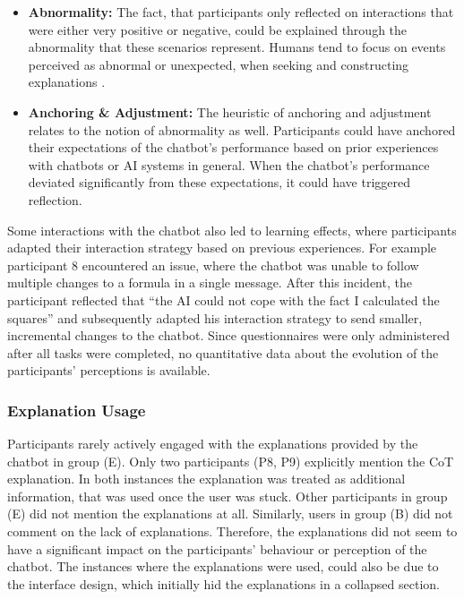 \begin{itemize}
    \item \textbf{Abnormality:} The fact, that participants only reflected on interactions that were either very positive or negative, could be explained through the abnormality that these scenarios represent. Humans tend to focus on events perceived as abnormal or unexpected, when seeking and constructing explanations \parencite{Miller2019}.
    \item \textbf{Anchoring \& Adjustment:} The heuristic of anchoring and adjustment \parencite{Tversky1974} relates to the notion of abnormality as well. Participants could have anchored their expectations of the chatbot's performance based on prior experiences with chatbots or AI systems in general. When the chatbot's performance deviated significantly from these expectations, it could have triggered reflection.
\end{itemize}

Some interactions with the chatbot also led to learning effects, where participants adapted their interaction strategy based on previous experiences. For example participant 8 encountered an issue, where the chatbot was unable to follow multiple changes to a formula in a single message. After this incident, the participant reflected that “the AI could not cope with the fact I calculated the squares” and subsequently adapted his interaction strategy to send smaller, incremental changes to the chatbot. Since questionnaires were only administered after all tasks were completed, no quantitative data about the evolution of the participants' perceptions is available.

\subsubsection{Explanation Usage} \label{sssec:explanation_usage}

Participants rarely actively engaged with the explanations provided by the chatbot in group (E). Only two participants (P8, P9) explicitly mention the \ac{CoT} explanation. In both instances the explanation was treated as additional information, that was used once the user was stuck. Other participants in group (E) did not mention the explanations at all. Similarly, users in group (B) did not comment on the lack of explanations.
Therefore, the explanations did not seem to have a significant impact on the participants' behaviour or perception of the chatbot. The instances where the explanations were used, could also be due to the interface design, which initially hid the explanations in a collapsed section.

